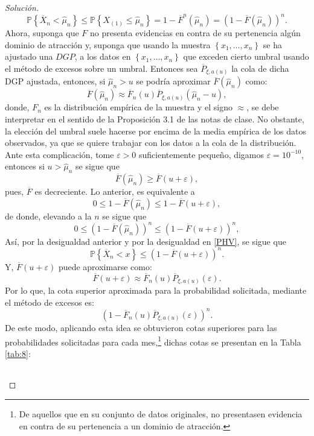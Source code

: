\documentclass[10.5pt,notitlepage]{article}
\newenvironment{solucion}
  {\begin{proof}[Solución]}
  {\end{proof}}
\newcommand{\PP}{\mathbb{P}}
\newcommand{\ee}{\varepsilon}
\newcommand{\kis}[1]{\left\{ #1 \right\}}
\theoremstyle{plain}
\begin{document}
\begin{solucion}
\begin{equation}
    \PP\kis{\overline{X}_n < \hat{\mu}_{n}} \leq \PP\kis{ X_{(1)} \leq \hat{\mu}_{n}} = 1- \overline{F}^{n}(\hat{\mu}_{n}) = (1 - \overline{F}(\hat{\mu}_{n}))^{n}.
\end{equation}
Ahora, suponga que \(F\) no presenta evidencias en contra de su pertenencia algún dominio de atracción y, suponga que usando la muestra \(\kis{x_1, \hdots, x_n}\) se ha ajustado una \(DGP\), a los datos en \(\kis{x_1, \hdots, x_n}\) que exceden cierto umbral usando el método de excesos sobre un umbral. Entonces sea \(\overline{P}_{\xi,a(u)}\) la cola de dicha DGP ajustada, entonces, si \(\hat{\mu}_{n}> u\) se podría aproximar \( \overline{F}(\hat{\mu}_{n})\) como: 
\[
\overline{F}(\hat{\mu}_{n}) \approx \overline{F}_{n}(u)\overline{P}_{\xi,a(u)}(\hat{\mu}_{n} - u),
\]
donde, \(F_n\) es la distribución empírica de la muestra y el signo \(\approx\), se debe interpretar en el sentido de la Proposición 3.1 de las notas de clase. No obstante, la elección del umbral suele hacerse por encima de la media empírica de los datos observados, ya que se quiere trabajar con los datos a la cola de la distribución. Ante esta complicación, tome \(\ee>0\) suficientemente pequeño, digamos \(\ee= 10^{-10}\), entonces si  \(u >\hat{\mu}_{n}\) se sigue que
\[
\overline{F}(\hat{\mu}_{n})\geq \overline{F}(u + \ee),
\]
pues, \(\overline{F}\) es decreciente. Lo anterior, es equivalente a 
\[
0\leq 1- \overline{F}(\hat{\mu}_{n})\leq 1 - \overline{F}(u+ \ee),
\]
de donde, elevando a la \(n\) se sigue que 
\[
0\leq (1- \overline{F}(\hat{\mu}_{n}))^{n}\leq (1 - \overline{F}(u + \ee))^{n},
\]
Así, por la desigualdad anterior y por la desigualdad en \eqref{PHV}, se sigue que
\begin{equation}\label{cota}
  \PP\kis{\overline{X}_n < x} \leq(1 - \overline{F}(u + \ee))^{n}.    
\end{equation}
Y, \(\overline{F}(u + \ee)\) puede aproximarse como:
\[
\overline{F}(u + \ee) \approx \overline{F}_{n}(u)\overline{P}_{\xi,a(u)}(\ee).
\]
Por lo que, la cota superior aproximada para la probabilidad solicitada, mediante el método de excesos es:
\[
(1 - \overline{F}_{n}(u)\overline{P}_{\xi,a(u)}(\ee))^{n}. 
\]
De este modo, aplicando esta idea se obtuvieron cotas superiores para las probabilidades solicitadas para cada mes,\footnote{De aquellos que en su conjunto de datos originales, no presentasen evidencia en contra de su pertenencia a un dominio de atracción.} dichas cotas se presentan en la Tabla \ref{tab:8}:
\begin{table}[H]
        \centering
        \begin{tabular}{@{}l@{\hskip 0.3in}r@{\hskip 0.3in}r@{\hskip 0.3in}r@{\hskip 0.3in}r@{\hskip 0.3in}r@{\hskip 0.3in}r@{\hskip 0.3in}r@{\hskip 0.3in}r@{\hskip 0.3in}r@{\hskip 0.3in}r@{}}

\end{tabular}
\end{table}
\end{solucion}
\end{document}
